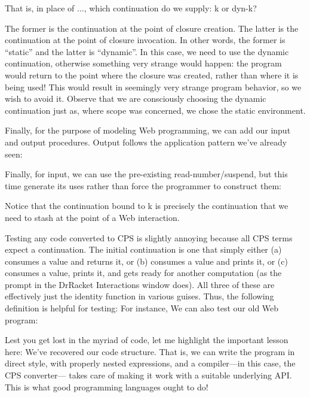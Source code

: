That is, in place of ..., which continuation do we supply: k or dyn-k?


The former is the continuation at the point of closure creation. The latter is
the continuation at the point of closure invocation. In other words, the former
is “static” and the latter is “dynamic”. In this case, we need to use the
dynamic continuation, otherwise something very strange would happen: the program
would return to the point where the closure was created, rather than where it is
being used! This would result in seemingly very strange program behavior, so we
wish to avoid it. Observe that we are consciously choosing the dynamic
continuation just as, where scope was concerned, we chose the static
environment.

Finally, for the purpose of modeling Web programming, we can add our input and
output procedures. Output follows the application pattern we’ve already seen:

Finally, for input, we can use the pre-existing read-number/suspend, but this
time generate its uses rather than force the programmer to construct them:

Notice that the continuation bound to k is precisely the continuation that we
need to stash at the point of a Web interaction.

Testing any code converted to CPS is slightly annoying because all CPS terms
expect a continuation. The initial continuation is one that simply either (a)
consumes a value and returns it, or (b) consumes a value and prints it, or (c)
consumes a value, prints it, and gets ready for another computation (as the
prompt in the DrRacket Interactions window does). All three of these are
effectively just the identity function in various guises. Thus, the following
definition is helpful for testing:
For instance,
We can also test our old Web program:

Lest you get lost in the myriad of code, let me highlight the important lesson
here: We’ve recovered our code structure. That is, we can write the program in
direct style, with properly nested expressions, and a compiler—in this case, the
CPS converter— takes care of making it work with a suitable underlying API. This
is what good programming languages ought to do!
